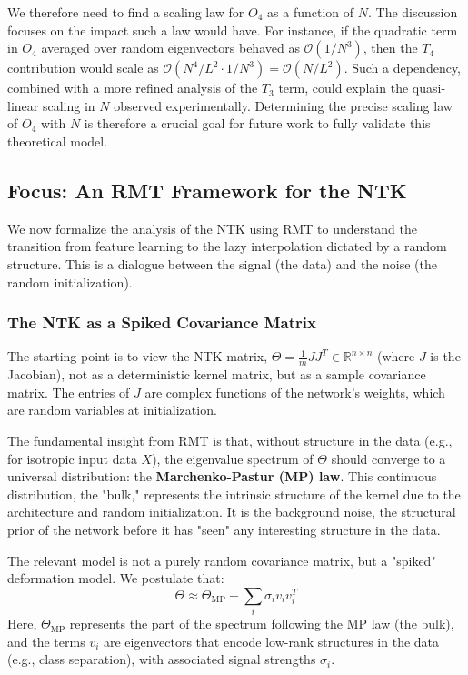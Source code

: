 \documentclass{article}
\newcommand{\R}{\mathbb{R}}
\begin{document}
We therefore need to find a scaling law for $O_4$ as a function of $N$. The discussion focuses on the impact such a law would have. For instance, if the quadratic term in $O_4$ averaged over random eigenvectors behaved as $\mathcal{O}(1/N^3)$, then the $T_4$ contribution would scale as $\mathcal{O}(N^4/L^2 \cdot 1/N^3) = \mathcal{O}(N/L^2)$. Such a dependency, combined with a more refined analysis of the $T_3$ term, could explain the quasi-linear scaling in $N$ observed experimentally. Determining the precise scaling law of $O_4$ with $N$ is therefore a crucial goal for future work to fully validate this theoretical model.

\subsection{Focus: An RMT Framework for the NTK}
We now formalize the analysis of the NTK using RMT to understand the transition from feature learning to the lazy interpolation dictated by a random structure. This is a dialogue between the signal (the data) and the noise (the random initialization).

\subsubsection{The NTK as a Spiked Covariance Matrix}
The starting point is to view the NTK matrix, $\Theta = \frac{1}{m}JJ^T \in \R^{n \times n}$ (where $J$ is the Jacobian), not as a deterministic kernel matrix, but as a sample covariance matrix. The entries of $J$ are complex functions of the network's weights, which are random variables at initialization.

The fundamental insight from RMT is that, without structure in the data (e.g., for isotropic input data $X$), the eigenvalue spectrum of $\Theta$ should converge to a universal distribution: the \textbf{Marchenko-Pastur (MP) law}. This continuous distribution, the "bulk," represents the intrinsic structure of the kernel due to the architecture and random initialization. It is the background noise, the structural prior of the network before it has "seen" any interesting structure in the data.

The relevant model is not a purely random covariance matrix, but a "spiked" deformation model. We postulate that:
\[
\Theta \approx \Theta_{\text{MP}} + \sum_{i} \sigma_i v_i v_i^T
\]
Here, $\Theta_{\text{MP}}$ represents the part of the spectrum following the MP law (the bulk), and the terms $v_i$ are eigenvectors that encode low-rank structures in the data (e.g., class separation), with associated signal strengths $\sigma_i$.
\end{document}
